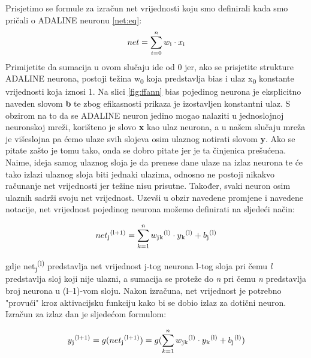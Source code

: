 \documentclass[times, utf8, zavrsni]{fer}
\begin{document}
\bigskip

Prisjetimo se formule za izračun net vrijednosti koju smo definirali kada smo pričali o ADALINE neuronu \eqref{net:eq}:
\[\text{$net = \sum\limits_{i=0}^n w\textsubscript{i} \cdot x\textsubscript{i}$}\]
Primijetite da sumacija u ovom slučaju ide od 0 jer, ako se prisjetite strukture ADALINE neurona, postoji težina w\textsubscript{0} koja predstavlja bias i ulaz x\textsubscript{0} konstante vrijednosti koja iznosi 1. Na slici \ref{fig:ffann} bias pojedinog neurona je eksplicitno naveden slovom \textbf{b} te zbog efikasnosti prikaza je izostavljen konstantni ulaz. S obzirom na to da se ADALINE neuron jedino mogao nalaziti u jednoslojnoj neuronskoj mreži, korišteno je slovo \textbf{x} kao ulaz neurona, a u našem slučaju mreža je višeslojna pa ćemo ulaze svih slojeva osim ulaznog notirati slovom \textbf{y}. Ako se pitate zašto je tomu tako, onda se dobro pitate jer je ta činjenica prešućena. Naime, ideja samog ulaznog sloja je da prenese dane ulaze na izlaz neurona te će tako izlazi ulaznog sloja biti jednaki ulazima, odnosno ne postoji nikakvo računanje net vrijednosti jer težine nisu prisutne. Također, svaki neuron osim ulaznih sadrži svoju net vrijednost. Uzevši u obzir navedene promjene i navedene notacije, net vrijednost pojedinog neurona možemo definirati na sljedeći način:

\begin{equation}
    \label{eq:novi-net}
    \text{$net\textsubscript{j}\textsuperscript{(l+1)} = \sum\limits_{k=1}^n w\textsubscript{j}\textsubscript{k}\textsuperscript{(l)} \cdot y\textsubscript{k}\textsuperscript{(l)} + b\textsubscript{j}\textsuperscript{(l)}$}
\end{equation}

gdje net\textsubscript{j}\textsuperscript{(l)} predstavlja net vrijednost j-tog neurona l-tog sloja pri čemu \textit{l} predstavlja sloj koji nije ulazni, a sumacija se proteže do \textit{n} pri čemu \textit{n} predstavlja broj neurona u (l--1)-vom sloju. Nakon izračuna, net vrijednost je potrebno "provući" kroz aktivacijsku funkciju kako bi se dobio izlaz za dotični neuron. Izračun za izlaz dan je sljedećom formulom: 

\begin{equation}
    \label{eq:izlaz}
    \text{$y\textsubscript{j}\textsuperscript{(l+1)} = g(net\textsubscript{j}\textsuperscript{(l+1)}) = g(\sum\limits_{k=1}^n w\textsubscript{j}\textsubscript{k}\textsuperscript{(l)} \cdot y\textsubscript{k}\textsuperscript{(l)} + b\textsubscript{j}\textsuperscript{(l)})$}
\end{equation}
\end{document}
